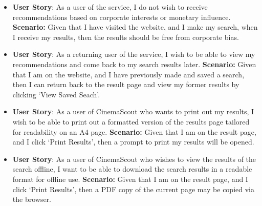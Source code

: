 \documentclass{article}
\begin{document}
\begin{itemize}
\item \textbf{User Story}: As a user of the service, I do not wish to receive
recommendations based on corporate interests or monetary influence.
\newline \textbf {Scenario:} Given that I have visited the website, and I make
my search, when I receive my results, then the results should be free from
corporate bias.

\item \textbf{User Story}: As a returning user of the service, I wish to be able
to view my recommendations and come back to my search results later.
\newline \textbf {Scenario:} Given that I am on the website, and I have
previously made and saved a search, then I can return back to the result page 
and view my former results by clicking `View Saved Seach'.

\item \textbf{User Story}: As a user of CinemaScout who wants to print out my
results, I wish to be able to print out a formatted version of the results page
tailored for readability on an A4 page.
\newline \textbf {Scenario:} Given that I am on the result page, and I click
`Print Results', then a prompt to print my results will be opened.

\item \textbf{User Story}: As a user of CinemaScout who wishes to view
the results of the search offline, I want to be able to download the search
results in a readable format for offline use.
\newline \textbf {Scenario:} Given that I am on the result page, and I click
`Print Results', then a PDF copy of the current page may be copied via the
browser.
\end{itemize}
\newpage
\end{document}
